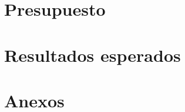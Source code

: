 \documentclass[12pt]{MIA-USA}
\begin{document}
    \chapter{Presupuesto}
    

    \chapter{Resultados esperados}
    

    \chapter*{Anexos}
    

	
 	
\end{document}

